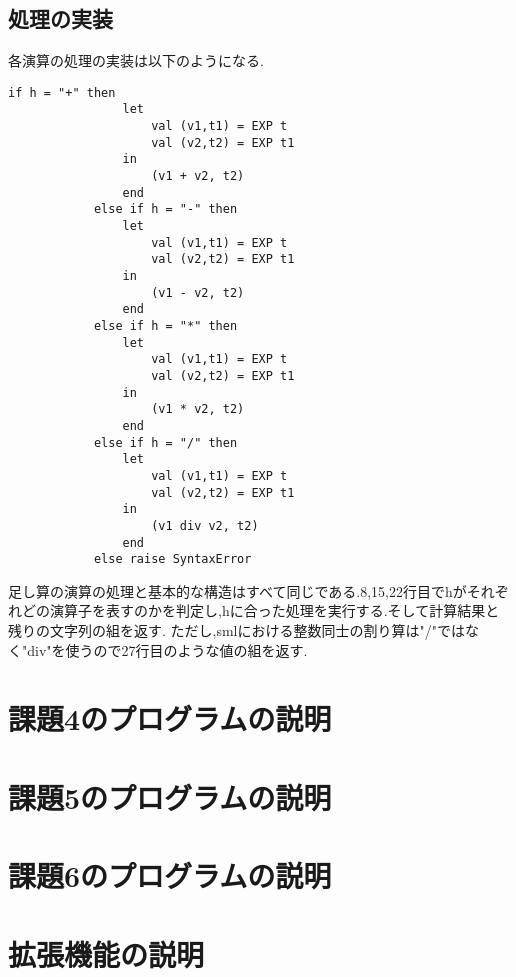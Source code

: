 \documentclass[dvipdfmx]{jarticle}
\begin{document}
\subsection{処理の実装}
各演算の処理の実装は以下のようになる.
\begin{lstlisting}[caption=処理の実装,label=fuga]
    if h = "+" then
                let
                    val (v1,t1) = EXP t
                    val (v2,t2) = EXP t1
                in
                    (v1 + v2, t2)
                end
            else if h = "-" then
                let
                    val (v1,t1) = EXP t
                    val (v2,t2) = EXP t1
                in
                    (v1 - v2, t2)
                end 
            else if h = "*" then
                let
                    val (v1,t1) = EXP t
                    val (v2,t2) = EXP t1
                in
                    (v1 * v2, t2)
                end 
            else if h = "/" then
                let
                    val (v1,t1) = EXP t
                    val (v2,t2) = EXP t1
                in
                    (v1 div v2, t2)
                end 
            else raise SyntaxError
\end{lstlisting}
足し算の演算の処理と基本的な構造はすべて同じである.8,15,22行目でhがそれぞれどの演算子を表すのかを判定し,hに合った処理を実行する.そして計算結果と残りの文字列の組を返す.
ただし,smlにおける整数同士の割り算は"/"ではなく"div"を使うので27行目のような値の組を返す.
\section{課題4のプログラムの説明}

\section{課題5のプログラムの説明}

\section{課題6のプログラムの説明}

\section{拡張機能の説明}
\end{document}
